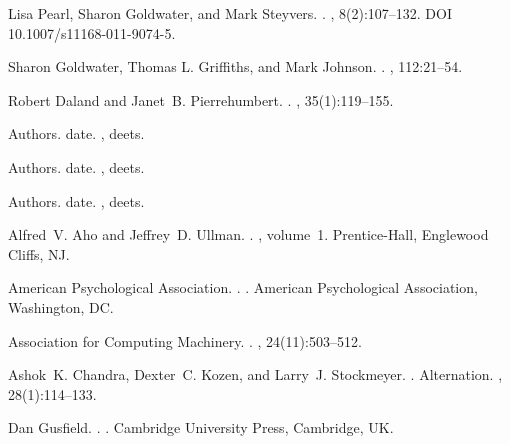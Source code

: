 \documentclass[11pt]{article}
\begin{document}
\begin{thebibliography}{}

Lisa Pearl, Sharon Goldwater, and Mark Steyvers.
.
, 8(2):107--132.
\newblock DOI 10.1007/s11168-011-9074-5.

Sharon Goldwater, Thomas L. Griffiths, and Mark Johnson.
.
, 112:21--54.

Robert Daland and Janet~B. Pierrehumbert.
.
, 35(1):119--155.

Authors.
\newblock date.
, deets.

Authors.
\newblock date.
, deets.

Authors.
\newblock date.
, deets.


Alfred~V. Aho and Jeffrey~D. Ullman.
.
, volume~1.
\newblock Prentice-{Hall}, Englewood Cliffs, NJ.

{American Psychological Association}.
.
.
\newblock American Psychological Association, Washington, DC.

{Association for Computing Machinery}.
.
, 24(11):503--512.

Ashok~K. Chandra, Dexter~C. Kozen, and Larry~J. Stockmeyer.
.
\newblock Alternation.
,
  28(1):114--133.

Dan Gusfield.
.
.
\newblock Cambridge University Press, Cambridge, UK.

\end{thebibliography}
\end{document}
